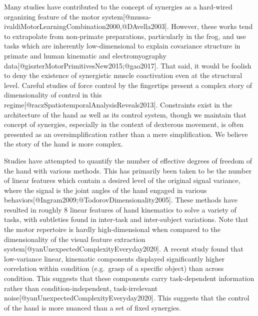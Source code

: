 Many studies have contributed to the concept of synergies as a
hard-wired organizing feature of the motor
system{[}@mussa-ivaldiMotorLearningCombination2000,@DAvella2003{]}.
However, these works tend to extrapolate from non-primate preparations,
particularly in the frog, and use tasks which are inherently
low-dimensional to explain covariance structure in primate and human
kinematic and electromyography
data{[}@giszterMotorPrimitivesNew2015;@gao2017{]}. That said, it would
be foolish to deny the existence of synergistic muscle coactivation even
at the structural level. Careful studies of force control by the
fingertips present a complex story of dimensionality of control in this
regime{[}@raczSpatiotemporalAnalysisReveals2013{]}. Constraints exist in
the architecture of the hand as well as its control system, though we
maintain that concept of synergies, especially in the context of
dexterous movement, is often presented as an oversimplification rather
than a mere simplification. We believe the story of the hand is more
complex.

Studies have attempted to quantify the number of effective degrees of
freedom of the hand with various methods. This has primarily been taken
to be the number of linear features which contain a desired level of the
original signal variance, where the signal is the joint angles of the
hand engaged in various
behaviors{[}@Ingram2009;@TodorovDimensionality2005{]}. These methods
have resulted in roughly 8 linear features of hand kinematics to solve a
variety of tasks, with subtleties found in inter-task and inter-subject
variations. Note that the motor repertoire is hardly high-dimensional
when compared to the dimensionality of the visual feature extraction
system{[}@yanUnexpectedComplexityEveryday2020{]}. A recent study found
that low-variance linear, kinematic components displayed significantly
higher correlation within condition (e.g.~grasp of a specific object)
than across condition. This suggests that these components carry
task-dependent information rather than condition-independent,
task-irrelevant noise{[}@yanUnexpectedComplexityEveryday2020{]}. This
suggests that the control of the hand is more nuanced than a set of
fixed synergies.

